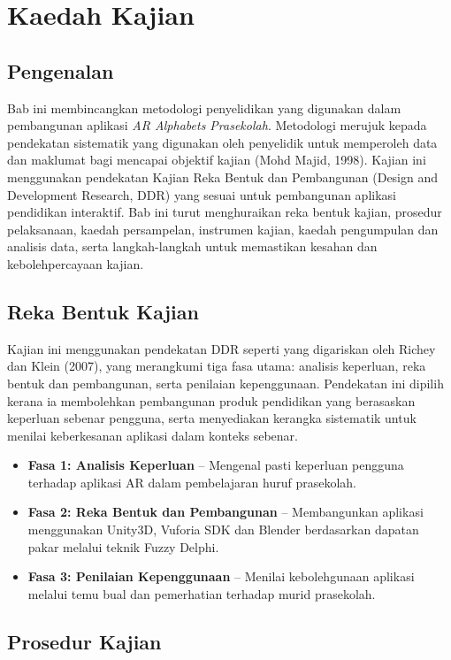 \chapter{Kaedah Kajian}

\section{Pengenalan}

Bab ini membincangkan metodologi penyelidikan yang digunakan dalam pembangunan aplikasi \textit{AR Alphabets Prasekolah}. Metodologi merujuk kepada pendekatan sistematik yang digunakan oleh penyelidik untuk memperoleh data dan maklumat bagi mencapai objektif kajian (Mohd Majid, 1998). Kajian ini menggunakan pendekatan Kajian Reka Bentuk dan Pembangunan (Design and Development Research, DDR) yang sesuai untuk pembangunan aplikasi pendidikan interaktif. Bab ini turut menghuraikan reka bentuk kajian, prosedur pelaksanaan, kaedah persampelan, instrumen kajian, kaedah pengumpulan dan analisis data, serta langkah-langkah untuk memastikan kesahan dan kebolehpercayaan kajian.

\section{Reka Bentuk Kajian}

Kajian ini menggunakan pendekatan DDR seperti yang digariskan oleh Richey dan Klein (2007), yang merangkumi tiga fasa utama: analisis keperluan, reka bentuk dan pembangunan, serta penilaian kepenggunaan. Pendekatan ini dipilih kerana ia membolehkan pembangunan produk pendidikan yang berasaskan keperluan sebenar pengguna, serta menyediakan kerangka sistematik untuk menilai keberkesanan aplikasi dalam konteks sebenar.

\begin{itemize}
  \item \textbf{Fasa 1: Analisis Keperluan} – Mengenal pasti keperluan pengguna terhadap aplikasi AR dalam pembelajaran huruf prasekolah.
  \item \textbf{Fasa 2: Reka Bentuk dan Pembangunan} – Membangunkan aplikasi menggunakan Unity3D, Vuforia SDK dan Blender berdasarkan dapatan pakar melalui teknik Fuzzy Delphi.
  \item \textbf{Fasa 3: Penilaian Kepenggunaan} – Menilai kebolehgunaan aplikasi melalui temu bual dan pemerhatian terhadap murid prasekolah.
\end{itemize}

\section{Prosedur Kajian}

